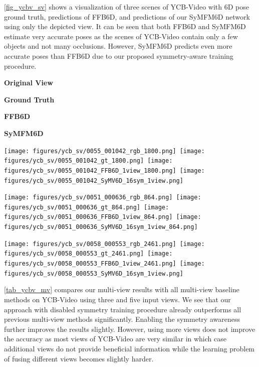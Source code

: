\cref{fig_ycbv_sv} shows a visualization of three scenes of YCB-Video with 6D pose ground truth, predictions of FFB6D, and predictions of our SyMFM6D network using only the depicted view. It can be seen that both FFB6D and SyMFM6D estimate very accurate poses as the scenes of YCB-Video contain only a few objects and not many occlusions. However, SyMFM6D predicts even more accurate poses than FFB6D due to our proposed symmetry-aware training procedure.

\begin{figure*}[htbp]
        \vspace{2mm}
	\centering
	\begin{minipage}{0.24\textwidth}
		\centering
		\textbf{Original View}
	\end{minipage}%
	\begin{minipage}{0.24\textwidth}
		\centering
		\textbf{Ground Truth}
	\end{minipage}%
	\begin{minipage}{0.24\textwidth}
		\centering
		\textbf{FFB6D}
	\end{minipage}%
	\begin{minipage}{0.24\textwidth}
		\centering
		\textbf{SyMFM6D}
	\end{minipage}%
	\texttt{[image: figures/ycb\_sv/0055\_001042\_rgb\_1800.png]}\,%
	\texttt{[image: figures/ycb\_sv/0055\_001042\_gt\_1800.png]}\,%
	\texttt{[image: figures/ycb\_sv/0055\_001042\_FFB6D\_1view\_1800.png]}\,%
	\texttt{[image: figures/ycb\_sv/0055\_001042\_SyMV6D\_16sym\_1view.png]}\,%
	\vspace{0.7mm}
	
	\texttt{[image: figures/ycb\_sv/0051\_000636\_rgb\_864.png]}\,%
	\texttt{[image: figures/ycb\_sv/0051\_000636\_gt\_864.png]}\,%
	\texttt{[image: figures/ycb\_sv/0051\_000636\_FFB6D\_1view\_864.png]}\,%
	\texttt{[image: figures/ycb\_sv/0051\_000636\_SyMV6D\_16sym\_1view\_864.png]}\,%
	\vspace{0.7mm}
	
	\texttt{[image: figures/ycb\_sv/0058\_000553\_rgb\_2461.png]}\,%
	\texttt{[image: figures/ycb\_sv/0058\_000553\_gt\_2461.png]}\,%
	\texttt{[image: figures/ycb\_sv/0058\_000553\_FFB6D\_1view\_2461.png]}\,%
	\texttt{[image: figures/ycb\_sv/0058\_000553\_SyMV6D\_16sym\_1view.png]}\,%
	\caption{Comparison of 6D pose predictions on single frames of the YCB-Video dataset.}
	\label{fig_ycbv_sv}
\end{figure*}

\cref{tab_ycbv_mv} compares our multi-view results with all multi-view baseline methods on YCB-Video using three and five input views.
We see that our approach with disabled symmetry training procedure already outperforms all previous multi-view methods significantly. Enabling the symmetry awareness further improves the results slightly. However, 
using more views does not improve the accuracy as most views of YCB-Video are very similar in which case additional views do not provide beneficial information while the learning problem of fusing different views becomes slightly harder.

